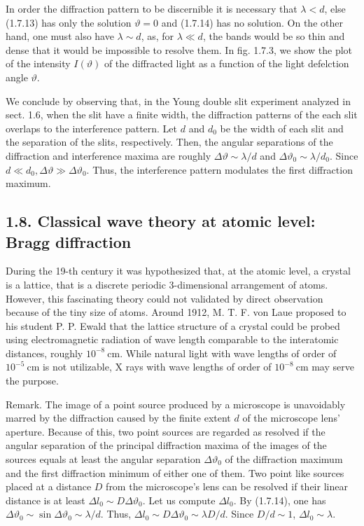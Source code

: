 \documentclass{article}
\begin{document}
In order the diffraction pattern to be discernible it is necessary that $\lambda<d$, else (1.7.13) has only the solution $\vartheta=0$ and (1.7.14) has no solution. On the other hand, one must also have $\lambda \sim d$, as, for $\lambda \ll d$, the bands would be so thin and dense that it would be impossible to resolve them. In fig. 1.7.3, we show the plot of the intensity $I(\vartheta)$ of the diffracted light as a function of the light defelction angle $\vartheta$.

We conclude by observing that, in the Young double slit experiment analyzed in sect. 1.6, when the slit have a finite width, the diffraction patterns of the each slit overlaps to the interference pattern. Let $d$ and $d_{0}$ be the width of each slit and the separation of the slits, respectively. Then, the angular separations of the diffraction and interference maxima are roughly $\Delta \vartheta \sim \lambda / d$ and $\Delta \vartheta_{0} \sim \lambda / d_{0}$. Since $d \ll d_{0}, \Delta \vartheta \gg \Delta \vartheta_{0}$. Thus, the interference pattern modulates the first diffraction maximum.

\subsection*{1.8. Classical wave theory at atomic level: Bragg diffraction}

During the 19-th century it was hypothesized that, at the atomic level, a crystal is a lattice, that is a discrete periodic 3-dimensional arrangement of atoms. However, this fascinating theory could not validated by direct observation because of the tiny size of atoms. Around 1912, M. T. F. von Laue proposed to his student P. P. Ewald that the lattice structure of a crystal could be probed using electromagnetic radiation of wave length comparable to the interatomic distances, roughly $10^{-8} \mathrm{~cm}$. While natural light with wave lengths of order of $10^{-5} \mathrm{~cm}$ is not utilizable, X rays with wave lengths of order of $10^{-8} \mathrm{~cm}$ may serve the purpose.

Remark. The image of a point source produced by a microscope is unavoidably marred by the diffraction caused by the finite extent $d$ of the microscope lens' aperture. Because of this, two point sources are regarded as resolved if the angular separation of the principal diffraction maxima of the images of the sources equals at least the angular separation $\Delta \vartheta_{0}$ of the diffraction maximum and the first diffraction minimum of either one of them. Two point like sources placed at a distance $D$ from the microscope's lens can be resolved if their linear distance is at least $\Delta l_{0} \sim D \Delta \vartheta_{0}$. Let us compute $\Delta l_{0}$. By (1.7.14), one has $\Delta \vartheta_{0} \sim \sin \Delta \vartheta_{0} \sim \lambda / d$. Thus, $\Delta l_{0} \sim D \Delta \vartheta_{0} \sim \lambda D / d$. Since $D / d \sim 1$, $\Delta l_{0} \sim \lambda$.
\end{document}
